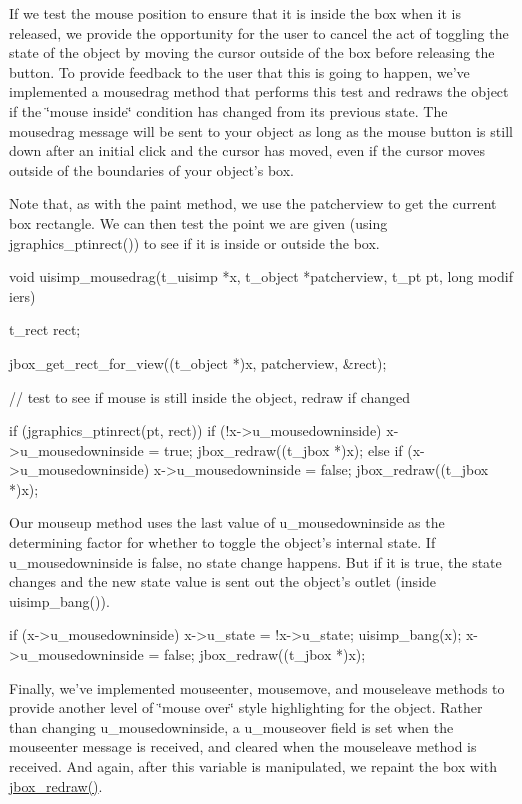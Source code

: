 If we test the mouse position to ensure that it is inside the box when it is released, we provide the opportunity for the user to cancel the act of toggling the state of the object by moving the cursor outside of the box before releasing the button. To provide feedback to the user that this is going to happen, we've implemented a mousedrag method that performs this test and redraws the object if the \char`\"{}mouse inside\char`\"{} condition has changed from its previous state. The mousedrag message will be sent to your object as long as the mouse button is still down after an initial click and the cursor has moved, even if the cursor moves outside of the boundaries of your object's box.

Note that, as with the paint method, we use the patcherview to get the current box rectangle. We can then test the point we are given (using jgraphics\_\-ptinrect()) to see if it is inside or outside the box.


\begin{DoxyCode}
    void uisimp_mousedrag(t_uisimp *x, t_object *patcherview, t_pt pt, long modif
      iers)
    {
        t_rect rect;

        jbox_get_rect_for_view((t_object *)x, patcherview, &rect);

        // test to see if mouse is still inside the object, redraw if changed

        if (jgraphics_ptinrect(pt, rect)) {
            if (!x->u_mousedowninside) {
                x->u_mousedowninside = true;
                jbox_redraw((t_jbox *)x);
            }
        } else {
            if (x->u_mousedowninside) {
                x->u_mousedowninside = false;
                jbox_redraw((t_jbox *)x);
            }
        }
    }
\end{DoxyCode}


Our mouseup method uses the last value of u\_\-mousedowninside as the determining factor for whether to toggle the object's internal state. If u\_\-mousedowninside is false, no state change happens. But if it is true, the state changes and the new state value is sent out the object's outlet (inside uisimp\_\-bang()).


\begin{DoxyCode}
    if (x->u_mousedowninside) {
        x->u_state = !x->u_state;
        uisimp_bang(x);
        x->u_mousedowninside = false;
        jbox_redraw((t_jbox *)x);
    }
\end{DoxyCode}


Finally, we've implemented mouseenter, mousemove, and mouseleave methods to provide another level of \char`\"{}mouse over\char`\"{} style highlighting for the object. Rather than changing u\_\-mousedowninside, a u\_\-mouseover field is set when the mouseenter message is received, and cleared when the mouseleave method is received. And again, after this variable is manipulated, we repaint the box with \hyperlink{group__jbox_ga92b553f8adc9994553590bbbcfd7e49d}{jbox\_\-redraw()}.


